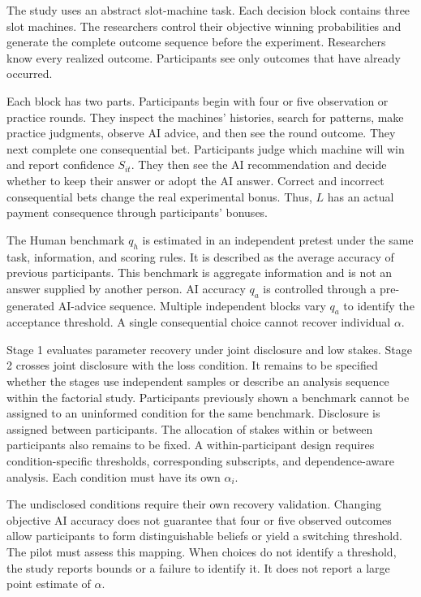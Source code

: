 \documentclass[11pt,a4paper]{article}
\begin{document}
The study uses an abstract slot-machine task. Each decision block contains three slot machines. The researchers control their objective winning probabilities and generate the complete outcome sequence before the experiment. Researchers know every realized outcome. Participants see only outcomes that have already occurred.

Each block has two parts. Participants begin with four or five observation or practice rounds. They inspect the machines' histories, search for patterns, make practice judgments, observe AI advice, and then see the round outcome. They next complete one consequential bet. Participants judge which machine will win and report confidence $S_{it}$. They then see the AI recommendation and decide whether to keep their answer or adopt the AI answer. Correct and incorrect consequential bets change the real experimental bonus. Thus, $L$ has an actual payment consequence through participants' bonuses.

The Human benchmark $q_h$ is estimated in an independent pretest under the same task, information, and scoring rules. It is described as the average accuracy of previous participants. This benchmark is aggregate information and is not an answer supplied by another person. AI accuracy $q_a$ is controlled through a pre-generated AI-advice sequence. Multiple independent blocks vary $q_a$ to identify the acceptance threshold. A single consequential choice cannot recover individual $\alpha$.

Stage 1 evaluates parameter recovery under joint disclosure and low stakes. Stage 2 crosses joint disclosure with the loss condition. It remains to be specified whether the stages use independent samples or describe an analysis sequence within the factorial study. Participants previously shown a benchmark cannot be assigned to an uninformed condition for the same benchmark. Disclosure is assigned between participants. The allocation of stakes within or between participants also remains to be fixed. A within-participant design requires condition-specific thresholds, corresponding subscripts, and dependence-aware analysis. Each condition must have its own $\alpha_i$.

The undisclosed conditions require their own recovery validation. Changing objective AI accuracy does not guarantee that four or five observed outcomes allow participants to form distinguishable beliefs or yield a switching threshold. The pilot must assess this mapping. When choices do not identify a threshold, the study reports bounds or a failure to identify it. It does not report a large point estimate of $\alpha$.
\end{document}
